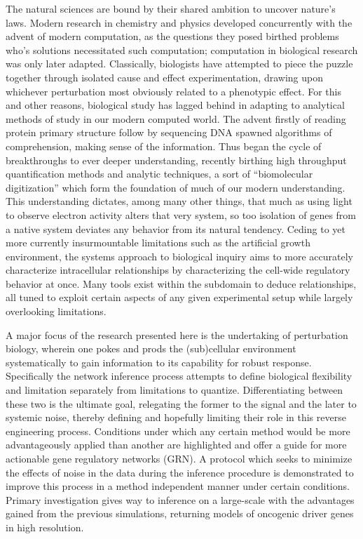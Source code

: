 The natural sciences are bound by their shared ambition to uncover nature's laws. Modern research in chemistry and physics developed concurrently with the advent of modern computation, as the questions they posed birthed problems who's solutions necessitated such computation; computation in biological research was only later adapted. Classically, biologists have attempted to piece the puzzle together through isolated cause and effect experimentation, drawing upon whichever perturbation most obviously related to a phenotypic effect. For this and other reasons, biological study has lagged behind in adapting to analytical methods of study in our modern computed world. The advent firstly of reading protein primary structure follow by sequencing DNA spawned algorithms of comprehension, making sense of the information. Thus began the cycle of breakthroughs to ever deeper understanding, recently birthing high throughput quantification methods and analytic techniques, a sort of ``biomolecular digitization'' which form the foundation of much of our modern understanding. This understanding dictates, among many other things, that much as using light to observe electron activity alters that very system, so too isolation of genes from a native system deviates any behavior from its natural tendency. Ceding to yet more currently insurmountable limitations such as the artificial growth environment, the systems approach to biological inquiry aims to more accurately characterize intracellular relationships by characterizing the cell-wide regulatory behavior at once. Many tools exist within the subdomain to deduce relationships, all tuned to exploit certain aspects of any given experimental setup while largely overlooking limitations. %

A major focus of the research presented here is the undertaking of perturbation biology, wherein one pokes and prods the (sub)cellular environment systematically to gain information to its capability for robust response. Specifically the network inference process attempts to define biological flexibility and limitation separately from limitations to quantize. Differentiating between these two is the ultimate goal, relegating the former to the signal and the later to systemic noise, thereby defining and hopefully limiting their role in this reverse engineering process. Conditions under which any certain method would be more advantageously applied than another are highlighted and offer a guide for more actionable gene regulatory networks (GRN). A protocol which seeks to minimize the effects of noise in the data during the inference procedure is demonstrated to improve this process in a method independent manner under certain conditions. Primary investigation gives way to inference on a large-scale with the advantages gained from the previous simulations, returning models of oncogenic driver genes in high resolution.




